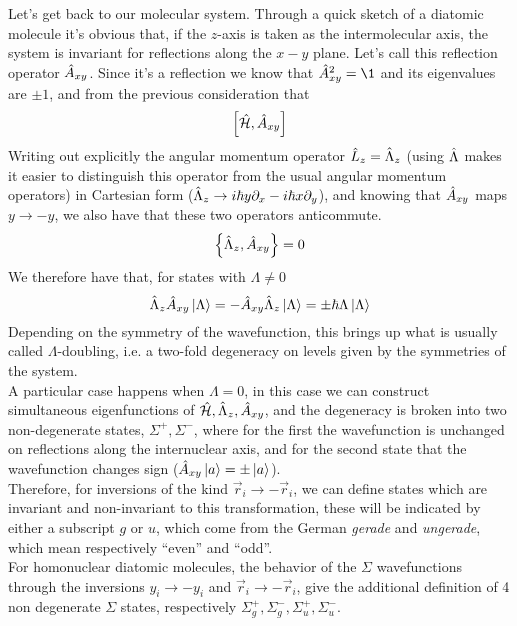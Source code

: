 \documentclass[../qm.tex]{subfiles}
\begin{document}
	Let's get back to our molecular system. Through a quick sketch of a diatomic molecule it's obvious that, if the $z$-axis is taken as the intermolecular axis, the system is invariant for reflections along the $x-y$ plane. Let's call this reflection operator $\hat{A}_{xy}$. Since it's a reflection we know that $\opr{A}_{xy}^2=\1$ and its eigenvalues are $\pm1$, and from the previous consideration that
	\begin{equation*}
		\comm{\opr{\ham}}{\opr{A}_{xy}}
	\end{equation*}
	Writing out explicitly the angular momentum operator $\hat{L}_z=\hat{\Lambda}_z$ (using $\hat{\Lambda}$ makes it easier to distinguish this operator from the usual angular momentum operators) in Cartesian form ($\hat{\Lambda}_z\to i\hbar y\partial_x-i\hbar x\partial_y$), and knowing that $\hat{A}_{xy}$ maps $y\to -y$, we also have that these two operators anticommute.
	\begin{equation*}
		\acomm{\opr{\Lambda}_z}{\opr{A}_{xy}}=0
	\end{equation*}
	We therefore have that, for states with $\Lambda\ne0$
	\begin{equation}
		\hat{\Lambda}_z\hat{A}_{xy}\ket{\Lambda}=-\hat{A}_{xy}\hat{\Lambda}_z\ket{\Lambda}=\pm\hbar\Lambda\ket{\Lambda}
		\label{eq:xyreflection}
	\end{equation}
	Depending on the symmetry of the wavefunction, this brings up what is usually called $\Lambda$-doubling, i.e. a two-fold degeneracy on levels given by the symmetries of the system.\\
	A particular case happens when $\Lambda=0$, in this case we can construct simultaneous eigenfunctions of $\hat{\mathcal{H}},\hat{\Lambda}_z,\hat{A}_{xy}$, and the degeneracy is broken into two non-degenerate states, $\Sigma^+,\Sigma^-$, where for the first the wavefunction is unchanged on reflections along the internuclear axis, and for the second state that the wavefunction changes sign ($\hat{A}_{xy}\ket{a}=\pm\ket{a}$).\\
	Therefore, for inversions of the kind $\vec{r}_i\to-\vec{r}_i$, we can define states which are invariant and non-invariant to this transformation, these will be indicated by either a subscript $g$ or $u$, which come from the German \textit{gerade} and \textit{ungerade}, which mean respectively ``even'' and ``odd''.\\
	For homonuclear diatomic molecules, the behavior of the $\Sigma$ wavefunctions through the inversions $y_i\to-y_i$ and $\vec{r}_i\to-\vec{r}_i$, give the additional definition of 4 non degenerate $\Sigma$ states, respectively $\Sigma_g^+,\Sigma_g^-,\Sigma_u^+,\Sigma_u^-$.\\
\end{document}

